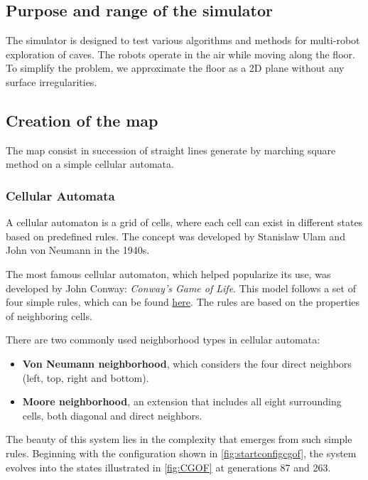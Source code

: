 \documentclass[../main.tex]{subfiles}
\begin{document}
\subsection{Purpose and range of the simulator}

The simulator is designed to test various algorithms and methods for multi-robot exploration of caves. The robots operate in the air while moving along the floor. To simplify the problem, we approximate the floor as a 2D plane without any surface irregularities.

\subsection{Creation of the map}
\label{sec:map_creation}

The map consist in succession of straight lines generate by marching square method on a simple cellular automata. 

\subsubsection{Cellular Automata}
A cellular automaton is a grid of cells, where each cell can exist in different states based on predefined rules. The concept was developed by Stanislaw Ulam and John von Neumann in the 1940s.  

\vspace{1em}

The most famous cellular automaton, which helped popularize its use, was developed by John Conway: \textit{Conway's Game of Life}. This model follows a set of four simple rules, which can be found \href{URL}{here}. The rules are based on the properties of neighboring cells.  

\vspace{1em}

There are two commonly used neighborhood types in cellular automata:  
\begin{itemize}  
    \item \textbf{Von Neumann neighborhood}, which considers the four direct neighbors (left, top, right and bottom).  
    \item \textbf{Moore neighborhood}, an extension that includes all eight surrounding cells, both diagonal and direct neighbors.  
\end{itemize}

\vspace{0.5em}

The beauty of this system lies in the complexity that emerges from such simple rules. Beginning with the configuration shown in \autoref{fig:startconfigcgof}, the system evolves into the states illustrated in \autoref{fig:CGOF} at generations 87 and 263.
\end{document}
